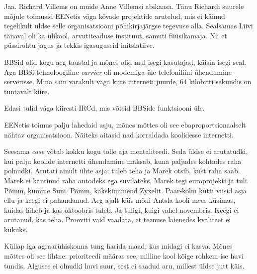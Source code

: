 Jaa. Richard Villems on muide Anne Villemsi abikaasa. 
Tänu Richardi suurele 
mõjule toimusid EENetis väga kõvade projektide arutelud, 
mis ei käinud tegelikult üldse selle organisatsiooni põhikirjajärgse tegevuse alla. 
Sealsamas Liivi tänaval oli ka ülikool, arvutiteaduse 
instituut, samuti füüsikamaja. Nii et püssirohtu jagus ja 
tekkis igasuguseid initsiatiive.


BBSid olid kogu aeg taustal ja mõnes olid mul isegi kasutajad, käisin
isegi seal. Aga BBSi tehnoloogiline \emph{carrier} oli modemiga üle
telefoniliini ühendumine serverisse. Mina sain varakult väga kiire 
interneti juurde, 64 kilobitti sekundis on tuntavalt kiire. 

Edasi tulid väga kiiresti IRCd, mis võtsid BBSide funktsiooni üle. 

EENetis toimus palju lahedaid asju, mõnes mõttes oli see 
ebaproportsionaalselt nähtav organisatsioon. Näiteks aitasid
nad korraldada koolidesse internetti.


Seesama \emph{case} võtab kokku kogu tolle aja mentaliteedi. 
Seda üldse ei arutatudki, kui palju koolide internetti 
ühendamine maksab, kuna paljudes kohtades raha polnudki. 
Arutati ainult ühte asja: tuleb teha ja Marek otsib, kust raha saab. Marek ei kantinud raha autodeks ega suvilateks, Marek tegi europrojekti ja tuli. Põmm, kümme 
Suni. Põmm, kakskümmend Zyxelit. Paar-kolm kutti viisid asja ellu ja 
keegi ei pahandanud. Aeg-ajalt käis mõni Antsla kooli mees 
küsimas, kuidas läheb ja kas oktoobris tuleb. Ja tuligi, kuigi vahel 
novembris. Keegi ei arutanud, kas teha. Prooviti vaid vaadata, et teenuse laienedes kvaliteet ei kukuks. 


Küllap iga agraarühiskonna tung harida maad, kus midagi ei kasva. Mõnes mõttes oli see lihtne: prioriteedi määras 
see, milline kool kõige rohkem ise huvi tundis. Alguses ei olnudki huvi suur, sest ei saadud aru, millest üldse jutt käis.

